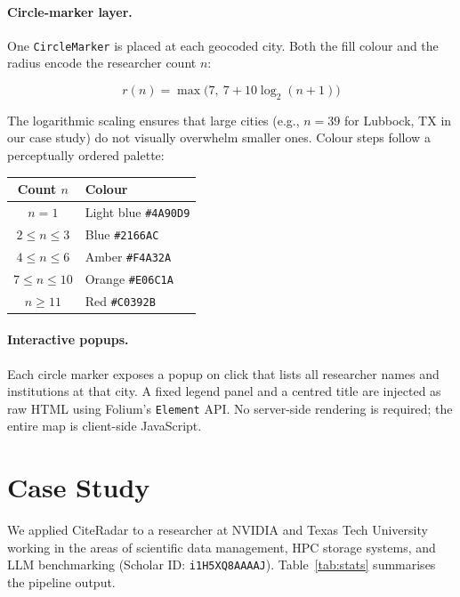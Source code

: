 \documentclass[11pt]{article}
\begin{document}
\paragraph{Circle-marker layer.}
One \texttt{CircleMarker} is placed at each geocoded city.
Both the fill colour and the radius encode the researcher count $n$:

\begin{equation}
r(n) = \max\!\bigl(7,\ 7 + 10\log_2(n+1)\bigr)
\label{eq:radius}
\end{equation}

The logarithmic scaling ensures that large cities (e.g., $n = 39$ for
Lubbock, TX in our case study) do not visually overwhelm smaller ones.
Colour steps follow a perceptually ordered palette:

\begin{center}
\begin{tabular}{cl}
\toprule
Count $n$ & Colour \\
\midrule
$n = 1$     & Light blue \texttt{\#4A90D9} \\
$2 \leq n \leq 3$  & Blue \texttt{\#2166AC} \\
$4 \leq n \leq 6$  & Amber \texttt{\#F4A32A} \\
$7 \leq n \leq 10$ & Orange \texttt{\#E06C1A} \\
$n \geq 11$        & Red \texttt{\#C0392B} \\
\bottomrule
\end{tabular}
\end{center}

\paragraph{Interactive popups.}
Each circle marker exposes a popup on click that lists all researcher names
and institutions at that city.
A fixed legend panel and a centred title are injected as raw HTML using
Folium's \texttt{Element} API.
No server-side rendering is required; the entire map is client-side JavaScript.


\section{Case Study}
\label{sec:eval}

We applied CiteRadar to a researcher at NVIDIA and Texas Tech University
working in the areas of scientific data management, HPC storage systems,
and LLM benchmarking (Scholar ID: \texttt{i1H5XQ8AAAAJ}).
Table~\ref{tab:stats} summarises the pipeline output.
\end{document}
